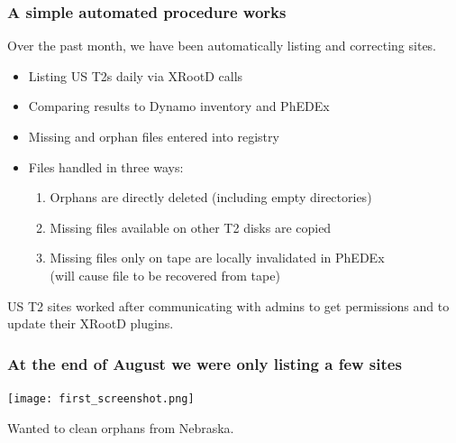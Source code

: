 \documentclass{beamer}
\begin{document}
\begin{frame}
  \frametitle{A simple automated procedure works}

  Over the past month,
  we have been automatically listing and correcting sites.

  \begin{itemize}
  \item Listing US T2s daily via XRootD calls
  \item Comparing results to Dynamo inventory and PhEDEx
  \item Missing and orphan files entered into registry
  \item Files handled in three ways:
    \begin{enumerate}
    \item Orphans are directly deleted (including empty directories)
    \item Missing files available on other T2 disks are copied
    \item Missing files only on tape are locally invalidated in PhEDEx \\
      (will cause file to be recovered from tape)
    \end{enumerate}
  \end{itemize}

  US T2 sites worked after communicating with admins
  to get permissions and to update their XRootD plugins.

\end{frame}

\begin{frame}
  \frametitle{At the end of August we were only listing a few sites}

  \texttt{[image: first\_screenshot.png]}

  Wanted to clean orphans from Nebraska.

\end{frame}
\end{document}
